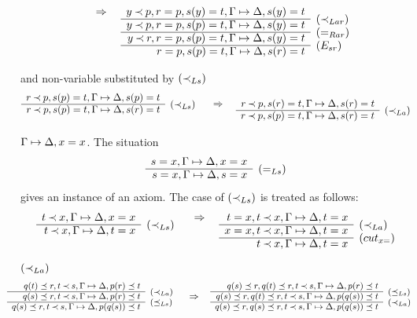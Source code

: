 \begin{PROOF}
\begin{LS}
\begin{LSA}
\begin{LSB}
\[{{}\conv
\prar{
y\Incl p, r=p, s(y)=t, \GSD, s(y)=t \cl
y\Incl p, r=p, s(p)=t, \GSD, s(y)=t & \rabove{\iLar} \cl
y\Incl r, r=p, s(p)=t, \GSD, s(y)=t & \rabove{\eRar} \cl
      r=p, s(p)=t, \GSD, s(r)=t & \rabove{\Esr} 
} }
\]
\item and non-variable substituted by $(\mathbin{\prec}_{Ls})$
\[\prarc{
r\Incl p, s(p)=t, \GSD, s(p)=t \cl
r\Incl p, s(p)=t, \GSD, s(r)=t & \rabove{\iLs}
}\conv
\prar{
r\Incl p, s(r)=t, \GSD, s(r)=t \cl
r\Incl p, s(p)=t, \GSD, s(r)=t & \rabove{\iLa}
}
\]
\end{LSB}
\item $\Gamma\mathrel{\mapsto}\Delta, x=x$.
The situation \[\prar{s=x,\GSD,x=x \cl s=x,\GSD,s=x& \rabove{\eLs}}\] gives an 
instance of an axiom. The case of $(\mathbin{\prec}_{Ls})$ is treated as follows:
\[\prar{
t\Incl x, \GSD, x=x \cl 
t\Incl x,\GSD, t=x & \rabove{\iLs}
}\conv
\prar{
t=x, t\Incl x,\GSD, t=x \cl
x=x, t\Incl x,\GSD, t=x & \rabove{\iLa} \cl
t\Incl x, \GSD, t=x & \rabove{(cut_{x=})}
}
\]
\end{LSA}
\item $(\mathbin{\prec}_{La})$
\[\sma{ \prarc{
q(t)\preceq r, t\Incl s, \GSD, p(r)\preceq t \cl
q(s)\preceq r, t\Incl s, \GSD, p(r)\preceq t & \rabove{\iLa} \cl
q(s)\preceq r, t\Incl s, \GSD, p(q(s))\preceq t & \rabove{\pLs} 
}\conv
\prarc{
q(s)\preceq r, q(t)\preceq r, t\Incl s, \GSD, p(r)\preceq t \cl
q(s)\preceq r, q(t)\preceq r, t\Incl s, \GSD, p(q(s))\preceq t & \rabove{\pLs} \cl
q(s)\preceq r, q(s)\preceq r, t\Incl s, \GSD, p(q(s))\preceq t & \rabove{\iLa} 
} }
\]

\end{LS}
\end{PROOF}

